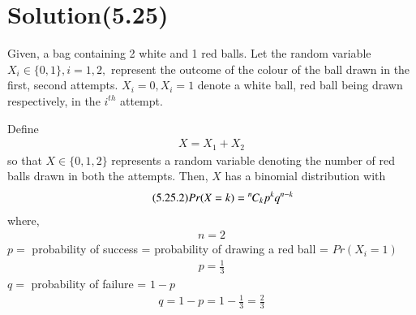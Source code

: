 \documentclass[journal,12pt,twocolumn]{IEEEtran}
\begin{document}
\section*{Solution(5.25)}
Given, a bag containing 2 white and 1 red balls. Let the random variable $X_{i}\in\{0,1\},i=1,2,$ represent the outcome of the colour of the ball drawn in the first, second attempts. $X_{i}=0,X_{i}=1$ denote a white ball, red ball being drawn respectively, in the $i^{th}$ attempt.
\begin{comment}
As the ball drawn in the first attempt is replaced in the bag, for both the attempts, the number of balls of a specified colour, and their probability  mass function's (pmf's) remain the same. i.e, 
\begin{align}
    \tag{5.25.1}
    n(X_{i}=0)=2\\
    \tag{5.25.2}
    n(X_{i}=1)=1\\
    \tag{5.25.3}
    \therefore n(X_{i}=0)+n(X_{i}=1)=3 
\end{align}
and
\begin{align}
    \tag{5.25.4}
    \Pr(X_{i}=j) = 
	\begin{cases}
	\dfrac{2}{3}, &j=0 \\~\\[-1em]
	\dfrac{1}{3}, &j=1 \\~\\[-1em]
	0, & otherwise
	\end{cases}
\end{align}
\newpage
\end{comment}
\newline
\newline
Define 
\begin{align}
    \tag{5.25.1}
    X=X_{1}+X_{2}
\end{align}
so that $X\in\{0,1,2\}$ represents a random variable denoting the number of red balls drawn in both the attempts. Then, $X$ has a binomial distribution with 
\begin{align}
    \tag{5.25.2}
    Pr(X=k)={{{}^{n}\mkern-1muC_{k}}}p^{k}q^{n-k}
    \label{eq:binomialdistr}
\end{align}
where,
\begin{align}
    \tag{5.25.3}
    n=2
\end{align}
$p =$ probability of success = probability of drawing a red ball = $Pr(X_{i}=1)$
\begin{align}
    \tag{5.25.4}
    p=\frac{1}{3}
\end{align}
$q =$ probability of failure = $1-p$
\begin{align}
    \tag{5.25.5}
    q=1-p=1-\frac{1}{3}=\frac{2}{3}
\end{align}
\end{document}
